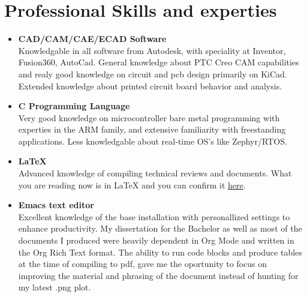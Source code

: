 \documentclass[a4paper,9pt]{extarticle}
\begin{document}
\section*{Professional Skills and experties}
\begin{itemize}
\item{\textbf{CAD/CAM/CAE/ECAD Software}} \\
        Knowledgable in all software from Autodesk, with speciality at Inventor, Fusion360, AutoCad. General knowledge about PTC Creo CAM capabilities and realy good knowledge on circuit and pcb design primarily on KiCad. Extended knowledge about printed circuit board behavior and analysis.\\

\item{\textbf{C Programming Language}}\\
        \noindent
        Very good knowledge on microcontroller bare metal programming with experties in the ARM family,
        and extensive familiarity with freestanding applications. Less knowledgable about real-time OS's
        like Zephyr/RTOS.\\

\item{\textbf{LaTeX}} \\
        \noindent
        Advanced knowledge of compiling technical reviews and documents. What you are
        reading now is in LaTeX and you can confirm it \href{https://github.com/goodvibrations32/goodvibrations32/tree/master?search=1}{here}.\\

\item{\textbf{Emacs text editor}} \\
        \noindent
        Excellent knowledge of the base installation with personallized settings to enhance
        productivity. My dissertation for the Bachelor as well as most of the documents I
        produced were heavily dependent in Org Mode and written in the Org Rich Text format. 
        The ability to run code blocks and produce tables at the time of compiling to pdf,
        gave me the oportunity to focus on improving the material and phrasing of the
        document instead of hunting for my latest .png plot.\\


\end{itemize}
\end{document}
